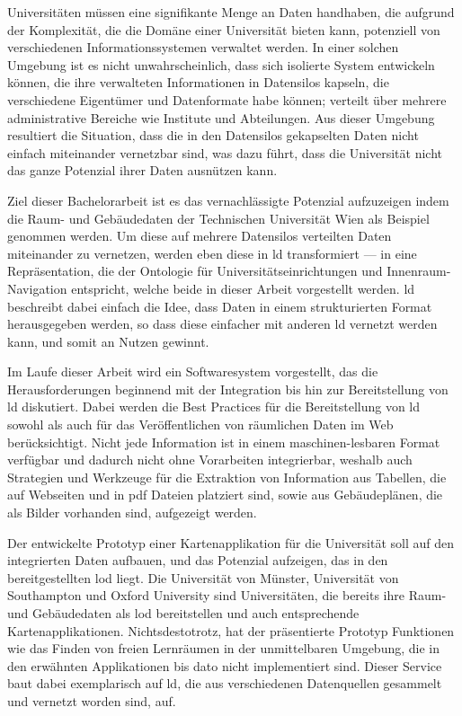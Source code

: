 \documentclass[draft,final]{vutinfth} %
\begin{document}
\begin{kurzfassung}
Universitäten müssen eine signifikante Menge an Daten handhaben, die aufgrund der Komplexität, die die Domäne einer Universität bieten kann, potenziell von verschiedenen Informationssystemen verwaltet werden. In einer solchen Umgebung ist es nicht unwahrscheinlich, dass sich isolierte System entwickeln können, die ihre verwalteten Informationen in Datensilos kapseln, die verschiedene Eigentümer und Datenformate habe können; verteilt über mehrere administrative Bereiche wie Institute und Abteilungen. Aus dieser Umgebung resultiert die Situation, dass die in den Datensilos gekapselten Daten nicht einfach miteinander vernetzbar sind, was dazu führt, dass die Universität nicht das ganze Potenzial ihrer Daten ausnützen kann.

Ziel dieser Bachelorarbeit ist es das vernachlässigte Potenzial aufzuzeigen indem die Raum- und Gebäudedaten der Technischen Universität Wien als Beispiel genommen werden. Um diese auf mehrere Datensilos verteilten Daten miteinander zu vernetzen, werden eben diese in \gls{ld} transformiert --- in eine Repräsentation, die der Ontologie für Universitätseinrichtungen und Innenraum-Navigation entspricht, welche beide in dieser Arbeit vorgestellt werden. \gls{ld} beschreibt dabei einfach die Idee, dass Daten in einem strukturierten Format herausgegeben werden, so dass diese einfacher mit anderen \gls{ld} vernetzt werden kann, und somit an Nutzen gewinnt.

Im Laufe dieser Arbeit wird ein Softwaresystem vorgestellt, das die Herausforderungen beginnend mit der Integration bis hin zur Bereitstellung von \gls{ld} diskutiert. Dabei werden die Best Practices für die Bereitstellung von \gls{ld} \cite{hyland_best_2014} sowohl als auch für das Veröffentlichen von räumlichen Daten im Web\cite{tandy_spatial_2016} berücksichtigt. Nicht jede Information ist in einem maschinen-lesbaren Format verfügbar und dadurch nicht ohne Vorarbeiten integrierbar, weshalb auch Strategien und Werkzeuge für die Extraktion von Information aus Tabellen, die auf Webseiten und in \gls{pdf} Dateien platziert sind, sowie aus Gebäudeplänen, die als Bilder vorhanden sind, aufgezeigt werden.

Der entwickelte Prototyp einer Kartenapplikation für die Universität soll auf den integrierten Daten aufbauen, und das Potenzial aufzeigen, das in den bereitgestellten \gls{lod} liegt. Die Universität von Münster, Universität von Southampton und Oxford University sind Universitäten, die bereits ihre Raum- und Gebäudedaten als \gls{lod} bereitstellen und auch entsprechende Kartenapplikationen. Nichtsdestotrotz, hat der präsentierte Prototyp Funktionen wie das Finden von freien Lernräumen in der unmittelbaren Umgebung, die in den erwähnten Applikationen bis dato nicht implementiert sind. Dieser Service baut dabei exemplarisch auf \gls{ld}, die aus verschiedenen Datenquellen gesammelt und vernetzt worden sind, auf.

\end{kurzfassung}
\end{document}

